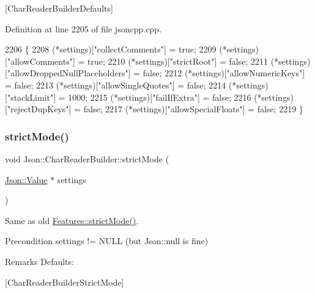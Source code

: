 \mbox{[}Char\+Reader\+Builder\+Defaults\mbox{]} 

Definition at line 2205 of file jsoncpp.\+cpp.


\begin{DoxyCode}
2206 \{
2208   (*settings)[\textcolor{stringliteral}{"collectComments"}] = \textcolor{keyword}{true};
2209   (*settings)[\textcolor{stringliteral}{"allowComments"}] = \textcolor{keyword}{true};
2210   (*settings)[\textcolor{stringliteral}{"strictRoot"}] = \textcolor{keyword}{false};
2211   (*settings)[\textcolor{stringliteral}{"allowDroppedNullPlaceholders"}] = \textcolor{keyword}{false};
2212   (*settings)[\textcolor{stringliteral}{"allowNumericKeys"}] = \textcolor{keyword}{false};
2213   (*settings)[\textcolor{stringliteral}{"allowSingleQuotes"}] = \textcolor{keyword}{false};
2214   (*settings)[\textcolor{stringliteral}{"stackLimit"}] = 1000;
2215   (*settings)[\textcolor{stringliteral}{"failIfExtra"}] = \textcolor{keyword}{false};
2216   (*settings)[\textcolor{stringliteral}{"rejectDupKeys"}] = \textcolor{keyword}{false};
2217   (*settings)[\textcolor{stringliteral}{"allowSpecialFloats"}] = \textcolor{keyword}{false};
2219 \}
\end{DoxyCode}
\mbox{\label{class_json_1_1_char_reader_builder_a9c19e3c5475f9072d527810d4bf56749}} 
\subsubsection{\texorpdfstring{strict\+Mode()}{strictMode()}}
{\footnotesize\ttfamily void Json\+::\+Char\+Reader\+Builder\+::strict\+Mode (\begin{DoxyParamCaption}\item[{\hyperlink{class_json_1_1_value}{Json\+::\+Value} $\ast$}]{settings }\end{DoxyParamCaption})\hspace{0.3cm}{\ttfamily [static]}}

Same as old \hyperlink{class_json_1_1_features_ae23176c14b2e79e81fb61fb1a8ab58ee}{Features\+::strict\+Mode()}. \begin{DoxyPrecond}{Precondition}
\textquotesingle{}settings\textquotesingle{} != N\+U\+LL (but Json\+::null is fine) 
\end{DoxyPrecond}
\begin{DoxyRemark}{Remarks}
Defaults\+: 
\begin{DoxyCodeInclude}
\end{DoxyCodeInclude}

\end{DoxyRemark}
\mbox{[}Char\+Reader\+Builder\+Strict\+Mode\mbox{]}

